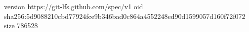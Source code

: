version https://git-lfs.github.com/spec/v1
oid sha256:5d9088210cbd77924fce9b346bad0c864a4552248ed90d1599057d160f72f072
size 786528
